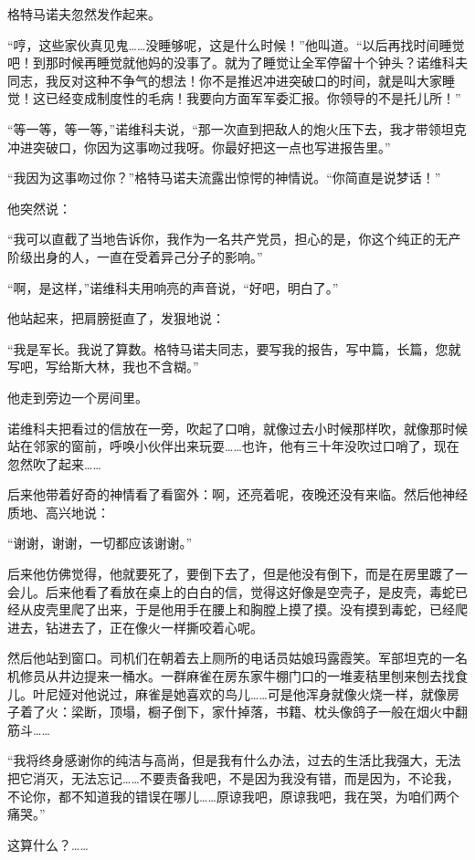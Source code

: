 格特马诺夫忽然发作起来。

“哼，这些家伙真见鬼……没睡够呢，这是什么时候！”他叫道。“以后再找时间睡觉吧！到那时候再睡觉就他妈的没事了。就为了睡觉让全军停留十个钟头？诺维科夫同志，我反对这种不争气的想法！你不是推迟冲进突破口的时间，就是叫大家睡觉！这已经变成制度性的毛病！我要向方面军军委汇报。你领导的不是托儿所！”

“等一等，等一等，”诺维科夫说，“那一次直到把敌人的炮火压下去，我才带领坦克冲进突破口，你因为这事吻过我呀。你最好把这一点也写进报告里。”

“我因为这事吻过你？”格特马诺夫流露出惊愕的神情说。“你简直是说梦话！”

他突然说：

“我可以直截了当地告诉你，我作为一名共产党员，担心的是，你这个纯正的无产阶级出身的人，一直在受着异己分子的影响。”

“啊，是这样，”诺维科夫用响亮的声音说，“好吧，明白了。”

他站起来，把肩膀挺直了，发狠地说：

“我是军长。我说了算数。格特马诺夫同志，要写我的报告，写中篇，长篇，您就写吧，写给斯大林，我也不含糊。”

他走到旁边一个房间里。

诺维科夫把看过的信放在一旁，吹起了口哨，就像过去小时候那样吹，就像那时候站在邻家的窗前，呼唤小伙伴出来玩耍……也许，他有三十年没吹过口哨了，现在忽然吹了起来……

后来他带着好奇的神情看了看窗外：啊，还亮着呢，夜晚还没有来临。然后他神经质地、高兴地说：

“谢谢，谢谢，一切都应该谢谢。”

后来他仿佛觉得，他就要死了，要倒下去了，但是他没有倒下，而是在房里踱了一会儿。后来他看了看放在桌上的白白的信，觉得这好像是空壳子，是皮壳，毒蛇已经从皮壳里爬了出来，于是他用手在腰上和胸膛上摸了摸。没有摸到毒蛇，已经爬进去，钻进去了，正在像火一样撕咬着心呢。

然后他站到窗口。司机们在朝着去上厕所的电话员姑娘玛露霞笑。军部坦克的一名机修员从井边提来一桶水。一群麻雀在房东家牛棚门口的一堆麦秸里刨来刨去找食儿。叶尼娅对他说过，麻雀是她喜欢的鸟儿……可是他浑身就像火烧一样，就像房子着了火：梁断，顶塌，橱子倒下，家什掉落，书籍、枕头像鸽子一般在烟火中翻筋斗……

“我将终身感谢你的纯洁与高尚，但是我有什么办法，过去的生活比我强大，无法把它消灭，无法忘记……不要责备我吧，不是因为我没有错，而是因为，不论我，不论你，都不知道我的错误在哪儿……原谅我吧，原谅我吧，我在哭，为咱们两个痛哭。”

这算什么？……

